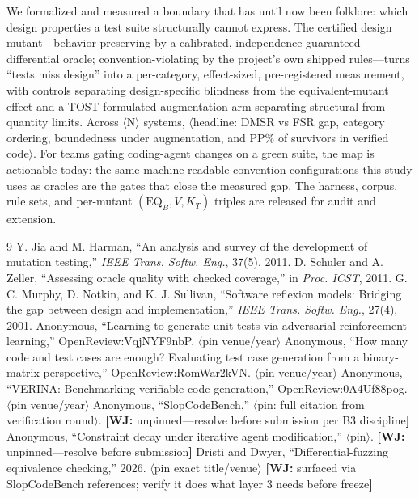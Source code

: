 \documentclass[conference]{IEEEtran}
\newcommand{\ph}[1]{\colorbox{yellow!35}{\small$\langle$\textsf{#1}$\rangle$}}
\newcommand{\wj}[1]{{\color{blue}\footnotesize\textbf{[WJ:} #1\textbf{]}}}
\newcommand{\eqb}{\mathrm{EQ}_B}
\begin{document}
We formalized and measured a boundary that has until now been folklore: which design properties a test suite structurally cannot express. The certified design mutant---behavior-preserving by a calibrated, independence-guaranteed differential oracle; convention-violating by the project's own shipped rules---turns ``tests miss design'' into a per-category, effect-sized, pre-registered measurement, with controls separating design-specific blindness from the equivalent-mutant effect and a TOST-formulated augmentation arm separating structural from quantity limits. Across \ph{N} systems, \ph{headline: DMSR vs FSR gap, category ordering, boundedness under augmentation, and PP\% of survivors in verified code}. For teams gating coding-agent changes on a green suite, the map is actionable today: the same machine-readable convention configurations this study uses as oracles are the gates that close the measured gap. The harness, corpus, rule sets, and per-mutant $(\eqb, V, K_T)$ triples are released for audit and extension.

\begin{thebibliography}{9}
 Y. Jia and M. Harman, ``An analysis and survey of the development of mutation testing,'' \emph{IEEE Trans. Softw. Eng.}, 37(5), 2011.
 D. Schuler and A. Zeller, ``Assessing oracle quality with checked coverage,'' in \emph{Proc. ICST}, 2011.
 G. C. Murphy, D. Notkin, and K. J. Sullivan, ``Software reflexion models: Bridging the gap between design and implementation,'' \emph{IEEE Trans. Softw. Eng.}, 27(4), 2001.
 Anonymous, ``Learning to generate unit tests via adversarial reinforcement learning,'' OpenReview:VqjNYF9nbP. \ph{pin venue/year}
 Anonymous, ``How many code and test cases are enough? Evaluating test case generation from a binary-matrix perspective,'' OpenReview:RomWar2kVN. \ph{pin venue/year}
 Anonymous, ``VERINA: Benchmarking verifiable code generation,'' OpenReview:0A4Uf88pog. \ph{pin venue/year}
 Anonymous, ``SlopCodeBench,'' \ph{pin: full citation from verification round}. \wj{unpinned---resolve before submission per B3 discipline}
 Anonymous, ``Constraint decay under iterative agent modification,'' \ph{pin}. \wj{unpinned---resolve before submission}
 Dristi and Dwyer, ``Differential-fuzzing equivalence checking,'' 2026. \ph{pin exact title/venue} \wj{surfaced via SlopCodeBench references; verify it does what layer 3 needs before freeze}
\end{thebibliography}

\balance
\end{document}
